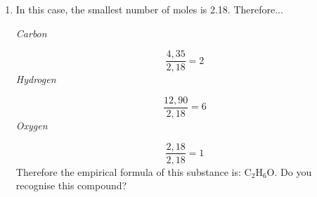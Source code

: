 {\begin{mdframed}[linewidth=4, leftmargin=40, rightmargin=40]
\begin{exercise}
\begin{enumerate}[noitemsep, label=\textbf{Step} \textbf{\arabic*}. ]
    \begin{equation}
    n\left(\mathrm{Oxygen}\right)=\frac{34,8}{16}=2,18\mathrm{mol}\tag{18.26}
      \end{equation}
      \item  
      \label{m38712*id281175}In this case, the smallest number of moles is 2.18. Therefore...\par 
      \label{m38712*id281179}
        \textsl{Carbon}
      \par 
      \label{m38712*id281185}\nopagebreak\noindent{}
        
    \begin{equation}
    \frac{4,35}{2,18}=2\tag{18.27}
      \end{equation}
      \label{m38712*id281217}
        \textsl{Hydrogen}
      \par 
      \label{m38712*id281223}\nopagebreak\noindent{}
        
    \begin{equation}
    \frac{12,90}{2,18}=6\tag{18.28}
      \end{equation}
      \label{m38712*id281254}
        \textsl{Oxygen}
      \par 
      \label{m38712*id281261}\nopagebreak\noindent{}
        
    \begin{equation}
    \frac{2,18}{2,18}=1\tag{18.29}
      \end{equation}
      \label{m38712*id281292}Therefore the empirical formula of this substance is: ${\mathrm{C}}_{2}{\mathrm{H}}_{6}\mathrm{O}$. Do you recognise this compound?\par 
\end{enumerate}
    \end{exercise}
    \end{mdframed}
    }
    \noindent
\label{m38712*secfhsst!!!underscore!!!id1235}\vspace{.5cm} 
      \noindent
